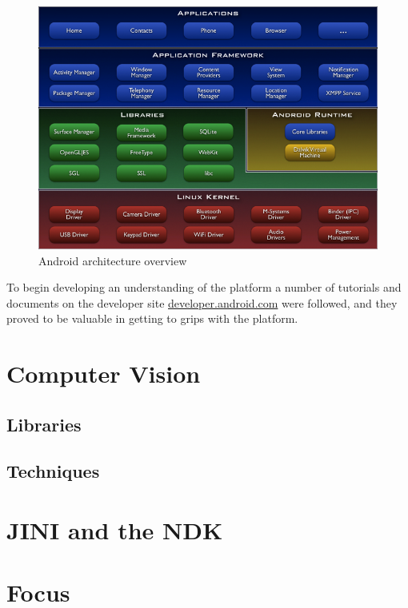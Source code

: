 \begin{figure}[h!]
\centering
    \includegraphics[width=1\textwidth]{research/images/android_arch.png}
	\caption{Android architecture overview}%
	\label{android_arch}
\end{figure}

To begin developing an understanding of the platform a number of tutorials and documents on the developer site \url{developer.android.com} were followed, and they proved to be valuable in getting to grips with the platform. 

\section{Computer Vision}

\subsection{Libraries}

\subsection{Techniques}

\section{JINI and the NDK}

\section{Focus}
